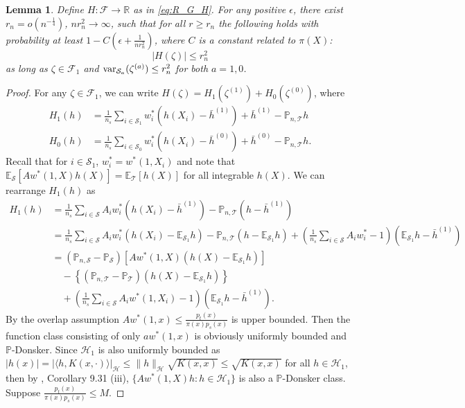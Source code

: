\documentclass[12pt]{article}
\newtheorem{lemma}{Lemma}
\newcommand{\E}{\mathbb{E}}
\newcommand{\prob}{\mathbb{P}}
\newcommand{\var}{\textnormal{var}}
\begin{document}
\begin{lemma}
	\label{lem:H_bound}
	Define $H: \mathcal{F} \rightarrow \mathbb{R}$ as in \eqref{eq:R_G_H}. For any positive $\epsilon$, there exist $r_n = o(n^{-\frac{1}{4}})$, $n r_n^2 \rightarrow \infty$, such that for all $r \ge r_n$ the following holds with probability at least $1 - C(\epsilon + \frac{1}{n r_n^2})$, where $C$ is a constant related to $\pi(X)$:
	\begin{equation*}
		|H(\zeta)| \le r_n^2
	\end{equation*}
	as long as $\zeta \in \mathcal{F}_1$ and $\var_{\mathcal{S}_a}(\zeta^{(a)}) \le r_n^2$ for both $a = 1, 0$.
\end{lemma}
\begin{proof}
	For any $\zeta \in \mathcal{F}_1$, we can write $H(\zeta) = H_1(\zeta^{(1)}) + H_0(\zeta^{(0)})$, where 
	\begin{align*}
		H_1(h) &= \frac{1}{n_s} \sum_{i \in \mathcal{S}_1} w^*_i (h(X_i) - \bar{h}^{(1)}) + \bar{h}^{(1)} - \prob_{n, \mathcal{T}} h \\
		H_0(h) &= \frac{1}{n_s} \sum_{i \in \mathcal{S}_0} w^*_i (h(X_i) - \bar{h}^{(0)}) + \bar{h}^{(0)} - \prob_{n, \mathcal{T}} h
		.\end{align*}
	Recall that for $i \in \mathcal{S}_1$, $w^*_i = w^*(1, X_i)$ and note that $\E_\mathcal{S}[A w^*(1, X) h(X)] = \E_\mathcal{T}[h(X)]$ for all integrable $h(X)$. We can rearrange $H_1(h)$ as
	\begin{align}
		H_1(h) 
		&= \frac{1}{n_s} \sum_{i \in \mathcal{S}} A_i w^*_i (h(X_i) - \bar{h}^{(1)}) - \prob_{n, \mathcal{T}} (h - \bar{h}^{(1)})
		\nonumber
		\\&=
		\frac{1}{n_s} \sum_{i \in \mathcal{S}} A_i w^*_i (h(X_i) - \E_{\mathcal{S}_1} h) - \prob_{n, \mathcal{T}} (h - \E_{\mathcal{S}_1} h) + (\frac{1}{n_s} \sum_{i \in \mathcal{S}} A_i w^*_i - 1)(\E_{\mathcal{S}_1} h - \bar{h}^{(1)})
		\nonumber
		\\&=
		(\prob_{n, \mathcal{S}} - \prob_{\mathcal{S}}) [A w^*(1, X)(h(X) - \E_{\mathcal{S}_1} h)]
		\label{eq:H_bound_term1}
		\\&\quad-
		\left\{ 
		(\prob_{n, \mathcal{T}} - \prob_\mathcal{T}) (h(X) - \E_{\mathcal{S}_1} h)
		\label{eq:H_bound_term2}
		\right\}
		\\&\quad+
		(\frac{1}{n_s} \sum_{i \in \mathcal{S}} A_i w^*(1, X_i) - 1)(\E_{\mathcal{S}_1} h - \bar{h}^{(1)})
		\label{eq:H_bound_term3}
		.\end{align}
	By the overlap assumption $Aw^*(1, x) \le \frac{p_t(x)}{\pi(x)p_s(x)}$ is upper bounded. Then the function class consisting of only $a w^*(1, x)$ is obviously uniformly bounded and $\prob$-Donsker. Since $\mathcal{H}_1$ is also uniformly bounded as $|h(x)| = |\langle h, K(x, \cdot) \rangle|_\mathcal{H} \le \| h \|_\mathcal{H} \sqrt{K(x, x)} \le \sqrt{K(x, x)} $ for all $h \in \mathcal{H}_1$, then by \citet{kosorok2007introduction}, Corollary 9.31 (iii), $\{A w^*(1, X) h: h \in \mathcal{H}_1\}$ is also a $\prob$-Donsker class. Suppose $\frac{p_t(x)}{\pi(x)p_s(x)} \le M$. 

\end{proof}
\end{document}
